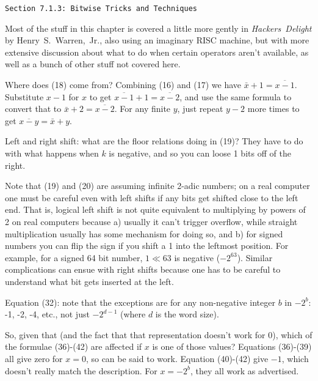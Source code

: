 \vfil\break
\centerline{\tt Section 7.1.3: Bitwise Tricks and Techniques}
\vskip0.2in

Most of the stuff in this chapter is covered a little more gently
in {\it Hackers~Delight} by Henry~S.~Warren,~Jr., also using an imaginary RISC machine,
but with more extensive discussion about what to do when certain
operators aren't available, as well as a bunch of other stuff not
covered here.

\vskip 0.1in 

\noindent [p 135] Where does (18) come from? \hfil\break Combining (16) and
(17) we have $\bar x + 1 = \overline{x - 1}$.  Substitute $x-1$ for $x$
to get $\overline{x - 1} + 1 = \overline{x - 2}$, and use the same
formula to convert that to $\bar x + 2 = \overline{x - 2}$.  For any
finite $y$, just repeat $y-2$ more times to get $\overline{x - y} = \bar x + y$.

\vskip 0.08in \noindent [p 135] Left and right shift: what are the floor
relations doing in (19)?  \hfil\break They have to do with what happens when $k$
is negative, and so you can loose 1 bits off of the right.

Note that (19) and (20) are assuming infinite 2-adic numbers; on a real
computer one must be careful even with left shifts if any bits get shifted
close to the left end.  That is, logical left shift is not quite equivalent
to multiplying by powers of 2 on real computers because a) usually
it can't trigger overflow, while straight multiplication usually has
some mechanism for doing so, and b) for signed numbers you can
flip the sign if you shift a 1 into the leftmost position.  For example,
for a signed 64 bit number, $1 \ll 63$ is negative ($-2^{63}$).
Similar complications can ensue with right shifts because one has to
be careful to understand what bit gets inserted at the left.

\vskip 0.1in 

\noindent [p 140] Equation (32): note that the exceptions 
are for any non-negative integer $b$ in $-2^b$: -1, -2, -4, etc.,
not just $-2^{d-1}$ (where $d$ is the word size).

\vskip 0.08in \noindent [p 140] So, given that (and the fact that
that representation doesn't work for 0), which of the formulae
(36)-(42) are affected if $x$ is one of those values? Equations (36)-(39)
all give zero for $x=0$, so can be said to work.
Equation (40)-(42) give $-1$, which doesn't really
match the description.  For $x = -2^b$, they all work as advertised.

